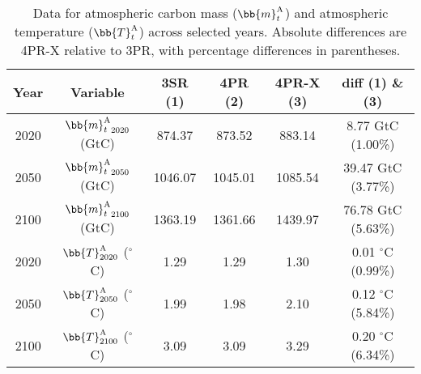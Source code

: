 \begin{table}[ht]
    \centering
    \begin{tabular}{c|c|c|c|c|c}
        \toprule
        Year & Variable & 3SR (1) & 4PR (2) & 4PR-X (3) & diff (1) \& (3) \\
        \midrule
        2020 & ${\bb{m}_t^{\text{A}}}_{2020}$ (GtC) & 874.37 & 873.52 & 883.14 & 8.77 GtC (1.00\%) \\
        2050 & ${\bb{m}_t^{\text{A}}}_{2050}$ (GtC) & 1046.07 & 1045.01 & 1085.54 & 39.47 GtC (3.77\%) \\
        2100 & ${\bb{m}_t^{\text{A}}}_{2100}$ (GtC) & 1363.19 & 1361.66 & 1439.97 & 76.78 GtC (5.63\%) \\
        \hline
        2020 & $\bb{T}^{\text{A}}_{2020}$ ($^\circ$C) & 1.29 & 1.29 & 1.30 & 0.01 $^\circ$C (0.99\%) \\
        2050 & $\bb{T}^{\text{A}}_{2050}$ ($^\circ$C) & 1.99 & 1.98 & 2.10 & 0.12 $^\circ$C (5.84\%) \\
        2100 & $\bb{T}^{\text{A}}_{2100}$ ($^\circ$C) & 3.09 & 3.09 & 3.29 & 0.20 $^\circ$C (6.34\%) \\
        \bottomrule
    \end{tabular}
     \caption{Data for atmospheric carbon mass (${\bb{m}_{t}^{\text{A}}}$) and atmospheric temperature ($\bb{T}^{\text{A}}_{t}$) across selected years. Absolute differences are 4PR-X relative to 3PR, with percentage differences in parentheses.}
    \label{tab:bau}
\end{table}